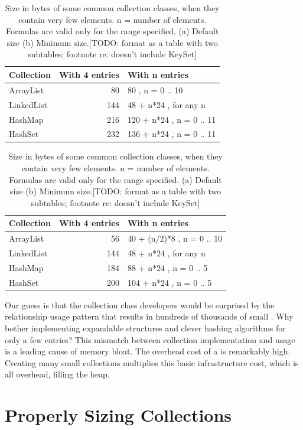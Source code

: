 \begin{table}
\centering
 		\begin{tabular}{lrl}
 		\toprule
	 	 Collection & With 4 entries & With n entries\\
	 	 \midrule
	 	ArrayList & 80 & 80 , n = 0 .. 10 \\
 		LinkedList & 144 & 48 + n*24 , for any n \\
 		HashMap & 216 & 120 + n*24 , n = 0 .. 11 \\
 		HashSet & 232 & 136 + n*24 , n = 0 .. 11 \\
	 	\bottomrule
	 	\end{tabular}

 		\begin{tabular}{lrl}
 		\toprule
	 	 Collection & With 4 entries & With n entries\\
	 	 \midrule
	 	ArrayList & 56 & 40 + (n/2)*8 , n = 0 .. 10 \\
 		LinkedList & 144 & 48 + n*24 , for any n\\
 		HashMap & 184 & 88 + n*24 , n = 0 .. 5 \\
 		HashSet & 200 & 104 + n*24 , n = 0 .. 5 \\
	 	\bottomrule
 	 	\end{tabular}
	\caption{Size in bytes of some common collection classes, when they contain very few
	elements. n = number of elements. Formulas are valid only for the range specified. (a) Default size
	(b) Minimum size.[TODO: format as a table with two subtables; footnote re: doesn't include KeySet]}
	\label{fig:sharing-pool}
\end{table}

Our guess is that the
collection class developers would be surprised by the relationship usage pattern
that results in hundreds of thousands of small . Why bother
implementing expandable structures and clever hashing algorithms for only a few entries?
This mismatch between collection implementation and usage is 
a leading cause of memory bloat. The overhead cost of a  is
remarkably high. Creating many small collections multiplies this basic infrastructure
cost, which is all overhead, filling the heap. 
 

\section{Properly Sizing Collections}
\label{sec:proper-size}

